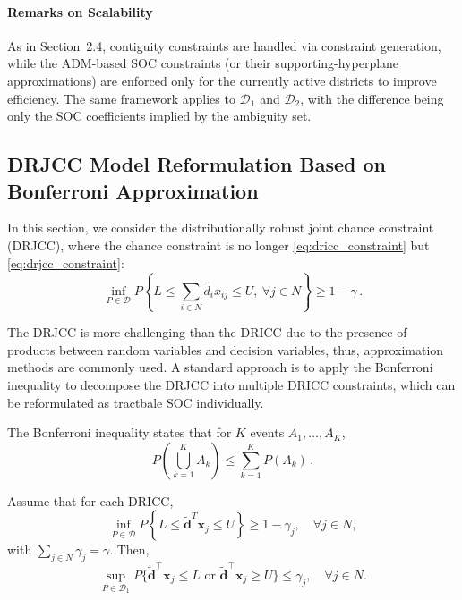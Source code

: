 \documentclass[preprint,12pt,authoryear]{elsarticle}
\begin{document}
\paragraph{Remarks on Scalability}
As in Section~2.4, contiguity constraints are handled via constraint generation, while the ADM-based SOC constraints (or their supporting-hyperplane approximations) are enforced only for the currently active districts to improve efficiency. The same framework applies to $\mathcal{D}_1$ and $\mathcal{D}_2$, with the difference being only the SOC coefficients implied by the ambiguity set.


\subsection{DRJCC Model Reformulation Based on Bonferroni Approximation}

In this section, we consider the distributionally robust joint chance constraint (DRJCC), where the chance constraint is no longer \eqref{eq:dricc_constraint} but \eqref{eq:drjcc_constraint}:
\begin{equation*}
\inf_{P\in\mathcal{D}} P\left\{L \leqslant \sum_{i\in N} \widetilde{d_i} x_{ij} \leqslant U, \ \forall j\in N \right\} \geqslant 1-\gamma \,.
\end{equation*}

The DRJCC is more challenging than the DRICC due to the presence of products between random variables and decision variables, thus, approximation methods are commonly used. A standard approach is to apply the Bonferroni inequality to decompose the DRJCC into multiple DRICC constraints, which can be reformulated as tractbale SOC individually.

The Bonferroni inequality states that for \(K\) events \(A_1, \ldots, A_K\),
\begin{equation}
P\left(\bigcup_{k=1}^{K} A_k\right) \leqslant \sum_{k=1}^{K} P(A_k) \,.
\end{equation}

Assume that for each DRICC,
\begin{equation}
\inf_{P\in\mathcal{D}} P\left\{L \leqslant \widetilde{\mathbf{d}}^T \mathbf{x}_j \leqslant U \right\} \geqslant 1-\gamma_j, \quad \forall j \in N,
\end{equation}
with \(\sum_{j\in N} \gamma_j = \gamma\). Then,
\begin{equation}
    \sup_{P \in \mathcal{D}_1} P \{\widetilde{\mathbf{d}}^\top \mathbf{x}_j \leqslant L \text{ or } \widetilde{\mathbf{d}}^\top \mathbf{x}_j \geqslant U \} \leqslant \gamma_j, \quad \forall j \in N.
\end{equation}
\end{document}

